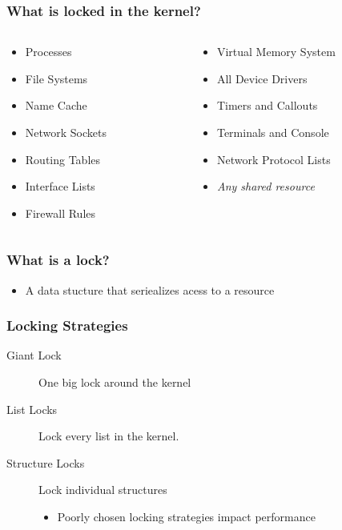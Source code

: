 \documentclass[pdftex]{beamer} %
\begin{document}
\begin{frame}[fragile]
  \frametitle{What is locked in the kernel?}
  \begin{columns}[t]
    \begin{column}{5cm}
      \begin{itemize}
      \item Processes
      \item File Systems
      \item Name Cache
      \item Network Sockets
      \item Routing Tables
      \item Interface Lists
      \item Firewall Rules
      \end{itemize}
    \end{column}
    \begin{column}{5cm}
      \begin{itemize}
      \item Virtual Memory System
      \item All Device Drivers
      \item Timers and Callouts
      \item Terminals and Console
      \item Network Protocol Lists
      \item \emph{Any shared resource}
      \end{itemize}
    \end{column}
  \end{columns}
\end{frame}

\begin{frame}
  \frametitle{What is a lock?}
  \begin{itemize}
  \item A data stucture that seriealizes acess to a resource
  \end{itemize}
\end{frame}

\begin{frame}
  \frametitle{Locking Strategies}
  \begin{description}
  \item [Giant Lock] One big lock around the kernel
  \item [List Locks] Lock every list in the kernel.
  \item [Structure Locks] Lock individual structures
    \begin{itemize}
    \item Poorly chosen locking strategies impact performance
    \end{itemize}
  \end{description}
\end{frame}
\end{document}
